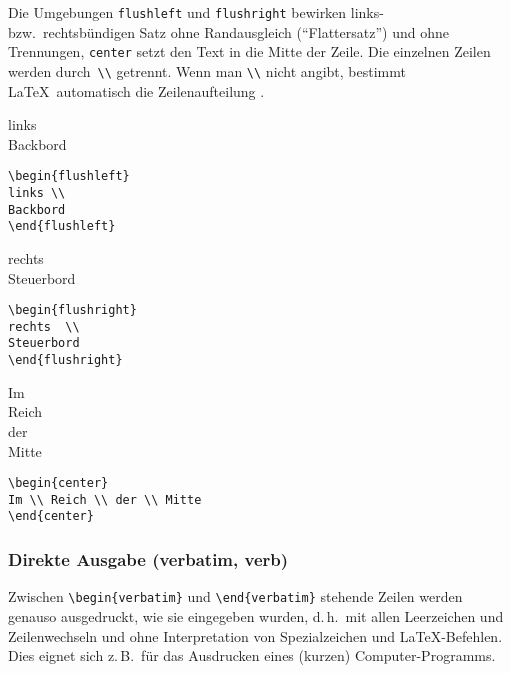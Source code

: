 Die Umgebungen \texttt{flushleft} und \texttt{flushright}
bewirken links- bzw.\ rechtsbündigen Satz ohne Randausgleich 
("`Flattersatz"') und ohne Trennungen, 
\texttt{center} setzt den Text in
die Mitte der Zeile.
Die einzelnen Zeilen werden durch~\verb|\\| getrennt.
Wenn man \verb|\\| nicht angibt, bestimmt \LaTeX\ automatisch die
Zeilenaufteilung%
.
\exa
\begin{flushleft}
links \\
Backbord
\end{flushleft}
\exb
\begin{verbatim}
\begin{flushleft}
links \\
Backbord
\end{flushleft}
\end{verbatim}
\exc
\exa
\begin{flushright}
rechts  \\
Steuerbord
\end{flushright}
\exb
\begin{verbatim}
\begin{flushright}
rechts  \\
Steuerbord
\end{flushright}
\end{verbatim}
\exc
\exa
\begin{center}
Im \\ Reich \\ der \\ Mitte
\end{center}
\exb
\begin{verbatim}
\begin{center}
Im \\ Reich \\ der \\ Mitte
\end{center}
\end{verbatim}
\exc


\subsubsection{Direkte Ausgabe (verbatim, verb)}
 
Zwischen \verb|\begin{verbatim}| und \verb|\end{verbatim}|
stehende Zeilen werden genauso ausgedruckt, wie sie eingegeben
wurden, d.\,h.\ mit allen Leerzeichen und Zeilenwechseln und ohne
Interpretation von Spezialzeichen und \LaTeX-Befehlen.  Dies
eignet sich z.\,B.\ für das Ausdrucken eines (kurzen)
Computer-Programms.

